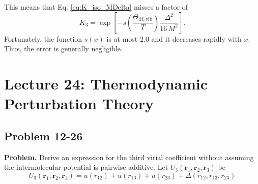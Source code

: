 \documentclass[twocolumn, 10pt]{article}
\numberwithin{equation}{section}
\newenvironment{problem}
{\par\medskip \color{problemblue}
  \textbf{Problem. }\ignorespaces}
{\medskip}
\newenvironment{solution}[1][\empty]
{\par\medskip\sffamily
  \textbf{\ifx\empty#1{Solution.}\relax\else{#1}\fi} \ignorespaces}
{\medskip}
\begin{document}
\begin{solution}
  This means that Eq. \eqref{eq:K_iso_MDelta}
  misses a factor of
  $$
  K_3
  =
  \exp\left[
    -s\left( \frac{ \Theta_{M, \mathrm{vib}} } { T } \right)
    \frac{ \Delta^2 } { 16 \, M^2 }
    \right].
  $$
  Fortunately,
  the function $s(x)$ is at most $2.0$
  and it decreases rapidly with $x$.
  Thus, the error is generally negligible.

\end{solution}


\section{Lecture 24: Thermodynamic Perturbation Theory}

\subsection{Problem 12-26}

\begin{problem}
  Derive an expression for the third virial coefficient
  without assuming the intermolecular potential is pairwise
  additive. Let $U_3(\mathbf r_1, \mathbf r_2, \mathbf r_3)$ be
  $$
  U_3(\mathbf r_1, \mathbf r_2, \mathbf r_3)
  =
  u(r_{12}) + u(r_{13}) + u(r_{23})
  + \Delta(r_{12}, r_{13}, r_{23})
  $$
\end{problem}
\end{document}
